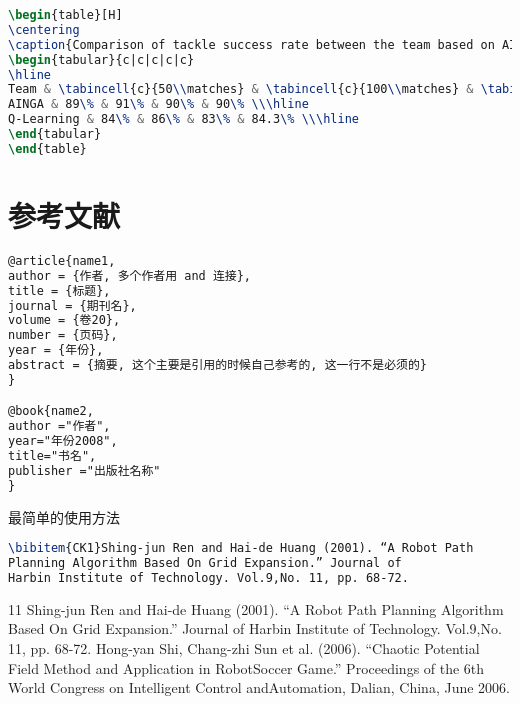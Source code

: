 \documentclass[a4paper,12pt]{article}
\begin{document}
\begin{lstlisting}[language=TeX,numbers=none,frame=lrtb,keywords={begin},label=Gamma,caption=Gamma]
\begin{table}[H]
\centering
\caption{Comparison of tackle success rate between the team based on AINGA and the team based on SGA.}
\begin{tabular}{c|c|c|c|c}
\hline
Team & \tabincell{c}{50\\matches} & \tabincell{c}{100\\matches} & \tabincell{c}{200\\matches} & \tabincell{c}{Success \\rate/\%}  \\ \hline
AINGA & 89\% & 91\% & 90\% & 90\% \\\hline
Q-Learning & 84\% & 86\% & 83\% & 84.3\% \\\hline
\end{tabular}
\end{table}
\end{lstlisting}

\section{参考文献}
\begin{lstlisting}[language=TeX,numbers=none,frame=lrtb,keywords={begin},label=Gamma,caption=Gamma]
@article{name1,
author = {作者, 多个作者用 and 连接},
title = {标题},
journal = {期刊名},
volume = {卷20},
number = {页码},
year = {年份},
abstract = {摘要, 这个主要是引用的时候自己参考的, 这一行不是必须的}
}

@book{name2,
author ="作者",
year="年份2008",
title="书名",
publisher ="出版社名称"
}
\end{lstlisting}

最简单的使用方法


\begin{lstlisting}[language=TeX,numbers=none,frame=lrtb,keywords={begin},label=Gamma,caption=Gamma]
\bibitem{CK1}Shing-jun Ren and Hai-de Huang (2001). “A Robot Path
Planning Algorithm Based On Grid Expansion.” Journal of
Harbin Institute of Technology. Vol.9,No. 11, pp. 68-72.
\end{lstlisting}

\begin{thebibliography}{11}
Shing-jun Ren and Hai-de Huang (2001). “A Robot Path
Planning Algorithm Based On Grid Expansion.” Journal of
Harbin Institute of Technology. Vol.9,No. 11, pp. 68-72.
 Hong-yan Shi, Chang-zhi Sun et al. (2006). “Chaotic
Potential Field Method and Application in RobotSoccer
Game.” Proceedings of the 6th World Congress on
Intelligent Control andAutomation, Dalian, China, June
2006.

\end{thebibliography}
\end{document}
